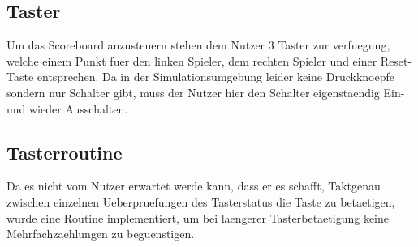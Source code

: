 \subsection{Taster}
Um das Scoreboard anzusteuern stehen dem Nutzer 3 Taster zur verfuegung, welche einem Punkt fuer den linken Spieler, dem rechten Spieler und einer Reset-Taste entsprechen. Da in der Simulationsumgebung leider keine Druckknoepfe sondern nur Schalter gibt, muss der Nutzer hier den Schalter eigenstaendig Ein- und wieder Ausschalten.

\subsection{Tasterroutine}
Da es nicht vom Nutzer erwartet werde kann, dass er es schafft, Taktgenau zwischen einzelnen Ueberpruefungen des Tasterstatus die Taste zu betaetigen, wurde eine Routine implementiert, um bei laengerer Tasterbetaetigung keine Mehrfachzaehlungen zu beguenstigen.


